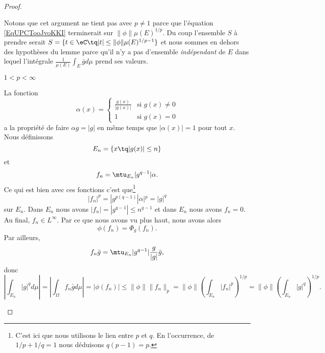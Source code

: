 \begin{proof}
\begin{subproof}
            Notons que cet argument ne tient pas avec \( p\neq 1\) parce que l'équation \eqref{EqUPCTooJvoKKI} terminerait sur \( \| \phi \|\mu(E)^{1/p}\). Du coup l'ensemble \( S\) à prendre serait \( S=\{ t\in \eC\tq | t |\leq \| \phi \|\mu(E)^{1/p-1} \}\) et nous sommes en dehors des hypothèses du lemme parce qu'il n'y a pas d'ensemble \emph{indépendant} de \( E\) dans lequel l'intégrale \( \frac{1}{ \mu(E) }\int_{E}\bar gd\mu\) prend ses valeurs.

        \item[\( 1<p<\infty\)]

            La fonction
            \begin{equation}
                \alpha(x)=\begin{cases}
                    \frac{ g(x) }{ | g(x) | }    &   \text{si } g(x)\neq 0\\
                    1    &    \text{si } g(x)=0
                \end{cases}
            \end{equation}
            a la propriété de faire \( \alpha g=| g |\) en même temps que \( | \alpha(x) |=1\) pour tout \( x\). Nous définissons
            \begin{equation}
                E_n=\{ x\tq | g(x) |\leq n \}
            \end{equation}
            et
            \begin{equation}
                f_n=\mtu_{E_n}| g^{q-1} |\alpha.
            \end{equation}
            Ce qui est bien avec ces fonctions c'est que\footnote{C'est ici que nous utilisons le lien entre \( p\) et \( q\). En l'occurrence, de \( 1/p+1/q=1\) nous déduisons \( q(p-1)=p\).}
            \begin{equation}
                | f_n |^p=| g^{p(q-1)} | \alpha |^p=| g |^q
            \end{equation}
            sur \( E_n\). Dans \( E_n\) nous avons \( | f_n |=| g^{q-1} |\leq n^{q-1}\) et dans \( E_n\) nous avons \( f_n=0\). Au final, \( f_n\in L^{\infty}\). Par ce que nous avons vu plus haut, nous avons alors
            \begin{equation}
                \phi(f_n)=\Phi_g(f_n).
            \end{equation}
            Par ailleurs,
            \begin{equation}
                f_n\bar g=\mtu_{E_n}| g^{q-1} |\frac{ g }{ | g | }\bar g,
            \end{equation}
            donc
            \begin{equation}
                \left|\int_{E_n}| g |^qd\mu\right|=|\int_{\Omega}f_n\bar gd\mu|=|\phi(f_n)|\leq \| \phi \|\| f_n \|_p=\| \phi \|\left( \int_{E_n}| f_n |^p \right)^{1/p}=\| \phi \|\left( \int_{E_n}| g |^q \right)^{1/p}.
            \end{equation}


\end{subproof}
\end{proof}
